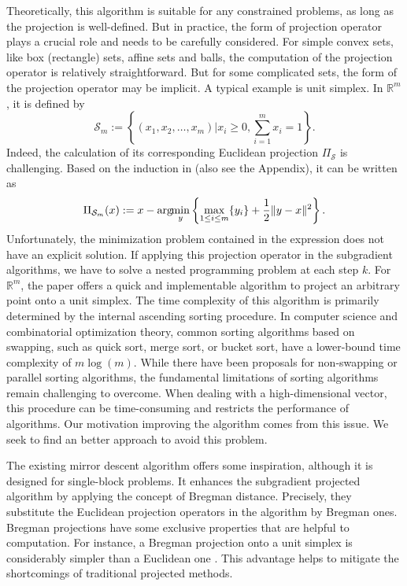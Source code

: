 \documentclass{svjour3}                %
\def \R {{\mathbb{R}}}
\def \S {{\mathcal{S}}}
\def\argmin{\arg\hspace{-1mm}\min}
\begin{document}
Theoretically, this algorithm is suitable for any constrained problems, as long as the projection is well-defined. But in practice, the form of projection operator plays a crucial role and needs to be carefully considered. For simple convex sets, like box (rectangle) sets, affine sets and balls, the computation of the projection operator is relatively straightforward. But for some complicated sets, the form of the projection operator may be implicit. A typical example is unit simplex. In $\R^m$, it is defined by
\begin{equation*}
\S_m:=\left\{ (x_1,x_2,\ldots,x_m) \Big| x_i\geq 0, \sum_{i=1}^m x_i = 1\right\}.
\end{equation*}
Indeed, the calculation of its corresponding Euclidean projection $\Pi_\S$ is challenging. Based on the induction in \cite{CY11} (also see the Appendix), it can be written as
\begin{equation*}
\Pi_{\S_m}(x):=x-\argmin_y \left\{ \max_{1\leq i \leq m}\{y_i\}+\frac{1}{2}\|y-x\|^2 \right\}.
\end{equation*}
Unfortunately, the minimization problem contained in the expression does not have an explicit solution. If applying this projection operator in the subgradient algorithms, we have to solve a nested programming problem at each step $k$. For $\R^m$, the paper \cite{CY11} offers a quick and implementable algorithm to project an arbitrary point onto a unit simplex. The time complexity of this algorithm is primarily determined by the internal ascending sorting procedure. In computer science and combinatorial optimization theory, common sorting algorithms based on swapping, such as quick sort, merge sort, or bucket sort, have a lower-bound time complexity of $m\log(m)$. While there have been proposals for non-swapping or parallel sorting algorithms, the fundamental limitations of sorting algorithms remain challenging to overcome. When dealing with a high-dimensional vector, this procedure can be time-consuming and restricts the performance of algorithms. Our motivation improving the algorithm comes from this issue. We seek to find an better approach to avoid this problem.

The existing mirror descent algorithm offers some inspiration, although it is designed for single-block problems. It enhances the subgradient projected algorithm by applying the concept of Bregman distance. Precisely, they substitute the Euclidean projection operators in the algorithm by Bregman ones. Bregman projections have some exclusive properties that are helpful to computation. For instance, a Bregman projection onto a unit simplex is considerably simpler than a Euclidean one \cite{AM03}. This advantage helps to mitigate the shortcomings of traditional projected methods.
\end{document}
